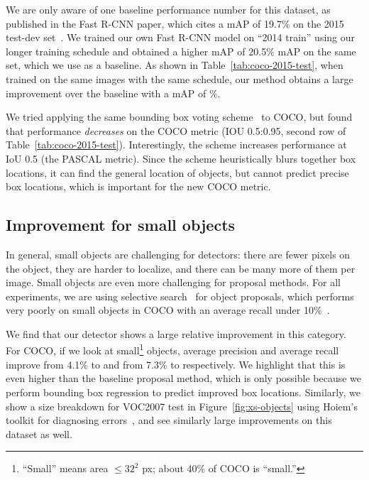 \documentclass[10pt,twocolumn,letterpaper]{article}
\begin{document}
We are only aware of one baseline performance number for this dataset, as
published in the Fast R-CNN paper, which cites a mAP of 19.7\% on the
2015 test-dev set~\cite{fast-rcnn}.  We trained our own Fast R-CNN model on
``2014 train'' using our longer training schedule and obtained a higher mAP of
20.5\% mAP on the same set, which we use as a baseline.
As shown in Table~\ref{tab:coco-2015-test}, when trained on the same images with
the same schedule, our method obtains a large improvement over the baseline with
a mAP of \BestCOCOTest{}\%.

We tried applying the same bounding box voting scheme~\cite{MR-CNN} to COCO, but
found that performance \textit{decreases} on the COCO metric (IOU 0.5:0.95,
second row of Table~\ref{tab:coco-2015-test}).  Interestingly, the scheme increases
performance at IoU 0.5 (the PASCAL metric).  Since the scheme heuristically
blurs together box locations, it can find the general location of objects, but
cannot predict precise box locations, which is important for the new COCO metric.
\subsection{Improvement for small objects}

In general, small objects are challenging for detectors: there are fewer pixels
on the object, they are harder to localize, and there can be many more of them
per image.  Small objects are even more challenging for proposal methods.  For
all experiments, we are using selective search~\cite{UijlingsIJCV2013} for
object proposals, which performs very poorly on small objects in COCO with an
average recall under 10\%~\cite{deepmask}.

We find that our detector shows a large relative improvement in this category.
For COCO, if we look at small\footnote{``Small'' means area $\le 32^2$
px; about 40\% of COCO is ``small.''} objects, average precision and average recall
improve from 4.1\% to  and from 7.3\% to  respectively.  We highlight
that this is even higher than the baseline proposal method, which is only
possible because we perform bounding box regression to predict improved box
locations.  Similarly, we show a size breakdown for VOC2007 test in
Figure~\ref{fig:xs-objects} using Hoiem's toolkit for diagnosing
errors~\cite{hoiem12error}, and see similarly large improvements on this dataset as well.
\end{document}
